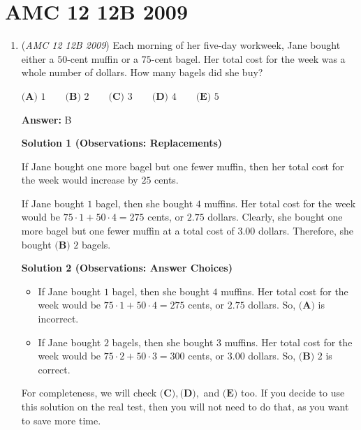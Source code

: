 \section{AMC 12 12B 2009}
        \begin{enumerate}
        	\item (\textit{AMC 12 12B 2009}) Each morning of her five-day workweek, Jane bought either a $50$-cent muffin or a $75$-cent bagel. Her total cost for the week was a whole number of dollars. How many bagels did she buy?


 $\textbf{(A) } 1\qquad\textbf{(B) } 2\qquad\textbf{(C) } 3\qquad\textbf{(D) } 4\qquad\textbf{(E) } 5$

 \textbf{Answer: }B



\textbf{Solution 1 (Observations: Replacements)}

If Jane bought one more bagel but one fewer muffin, then her total cost for the week would increase by $25$ cents.

 If Jane bought $1$ bagel, then she bought $4$ muffins. Her total cost for the week would be $75\cdot1+50\cdot4=275$ cents, or $2.75$ dollars. Clearly, she bought one more bagel but one fewer muffin at a total cost of $3.00$ dollars. Therefore, she bought $\boxed{\textbf{(B) } 2}$ bagels.

 



\textbf{Solution 2 (Observations: Answer Choices)}


            \begin{itemize}
        \item If Jane bought $1$ bagel, then she bought $4$ muffins. Her total cost for the week would be $75\cdot1+50\cdot4=275$ cents, or $2.75$ dollars. So, $\textbf{(A)}$ is incorrect.
            \end{itemize}
            
            \begin{itemize}
        \item If Jane bought $2$ bagels, then she bought $3$ muffins. Her total cost for the week would be $75\cdot2+50\cdot3=300$ cents, or $3.00$ dollars. So, $\boxed{\textbf{(B) } 2}$ is correct.
            \end{itemize}
            For completeness, we will check $\textbf{(C)},\textbf{(D)},$ and $\textbf{(E)}$ too. If you decide to use this solution on the real test, then you will not need to do that, as you want to save more time.


\end{enumerate}
